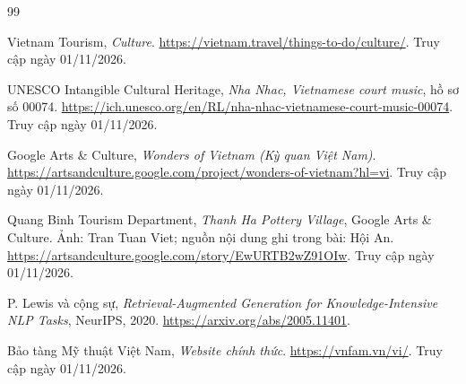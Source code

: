 \renewcommand{\refname}{Tài liệu tham khảo}
\begingroup
\raggedright
\begin{thebibliography}{99}

Vietnam Tourism, \textit{Culture}.
\url{https://vietnam.travel/things-to-do/culture/}.
Truy cập ngày 01/11/2026.

UNESCO Intangible Cultural Heritage,
\textit{Nha Nhac, Vietnamese court music}, hồ sơ số 00074.
\url{https://ich.unesco.org/en/RL/nha-nhac-vietnamese-court-music-00074}.
Truy cập ngày 01/11/2026.

Google Arts \& Culture, \textit{Wonders of Vietnam (Kỳ quan Việt Nam)}.
\url{https://artsandculture.google.com/project/wonders-of-vietnam?hl=vi}.
Truy cập ngày 01/11/2026.

Quang Binh Tourism Department, \textit{Thanh Ha Pottery Village},
Google Arts \& Culture. Ảnh: Tran Tuan Viet; nguồn nội dung ghi trong bài: Hội An.
\url{https://artsandculture.google.com/story/EwURTB2wZ91OIw}.
Truy cập ngày 01/11/2026.

P. Lewis và cộng sự, \textit{Retrieval-Augmented Generation for
Knowledge-Intensive NLP Tasks}, NeurIPS, 2020.
\url{https://arxiv.org/abs/2005.11401}.

Bảo tàng Mỹ thuật Việt Nam, \textit{Website chính thức}.
\url{https://vnfam.vn/vi/}. Truy cập ngày 01/11/2026.


\end{thebibliography}
\endgroup
